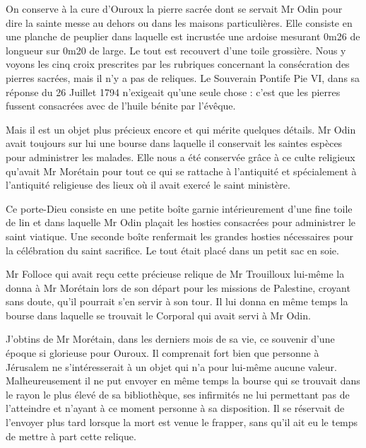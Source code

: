 On conserve à la cure d'Ouroux la pierre sacrée dont se servait Mr Odin pour dire la sainte messe au dehors ou dans les maisons particulières. Elle consiste en une planche de peuplier dans laquelle est incrustée une ardoise mesurant 0m26 de longueur sur 0m20 de large. Le tout est recouvert d'une toile grossière. Nous y voyons les cinq croix prescrites par les rubriques concernant la consécration des pierres sacrées, mais il n'y a pas de reliques. Le Souverain Pontife Pie VI, dans sa réponse du 26 Juillet 1794 n'exigeait qu'une seule chose : c'est que les pierres fussent consacrées avec de l'huile bénite par l'évêque.

Mais il est un objet plus précieux encore et qui mérite quelques détails. Mr Odin avait toujours sur lui une bourse dans laquelle il conservait les saintes espèces pour administrer les malades. Elle nous a été conservée grâce à ce culte religieux qu'avait Mr Morétain pour tout ce qui se rattache à l'antiquité et spécialement à l'antiquité religieuse des lieux où il avait exercé le saint ministère.

Ce porte-Dieu consiste en une petite boîte garnie intérieurement d'une fine toile de lin et dans laquelle Mr Odin plaçait les hosties
consacrées pour administrer le saint viatique. Une seconde boîte renfermait les grandes hosties nécessaires pour la célébration du saint sacrifice. Le tout était placé dans un petit sac en soie.

Mr Folloce qui avait reçu cette précieuse relique de Mr Trouilloux lui-même la donna à Mr Morétain lors de son départ pour les missions de Palestine, croyant sans doute, qu'il pourrait s'en servir à son tour. Il lui donna en même temps la bourse dans laquelle se trouvait le Corporal qui avait servi à Mr Odin.

J'obtins de Mr Morétain, dans les derniers mois de sa vie, ce souvenir d'une époque si glorieuse pour Ouroux. Il comprenait fort bien que personne à Jérusalem ne s'intéresserait à un objet qui n'a pour lui-même aucune valeur. Malheureusement il ne put envoyer en même temps la bourse qui se trouvait dans le rayon le plus élevé de sa bibliothèque, ses infirmités ne lui permettant pas de l'atteindre et n'ayant à ce moment personne à sa disposition. Il se réservait de l'envoyer plus tard lorsque la mort est venue le frapper, sans qu'il ait eu le temps de mettre à part cette relique.

